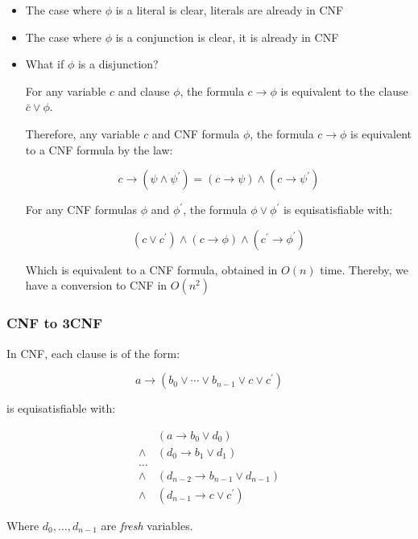 \documentclass{article}
\begin{document}
\begin{itemize}
  \item The case where $\phi$ is a literal is clear, literals are already in CNF
  \item The case where \(\phi\) is a conjunction is clear, it is already in CNF
  \item What if \(\phi\) is a disjunction?

        For any variable $c$ and clause \(\phi\), the formula $c \rightarrow \phi$ is equivalent to the clause $\bar{c} \vee \phi$.

        Therefore, any variable $c$ and CNF formula $\phi$, the formula $c \rightarrow \phi$ is equivalent to a CNF formula by the law:

        \[
        c \rightarrow (\psi\wedge\psi^{\prime}) = (c \rightarrow \psi) \wedge (c \rightarrow \psi^{\prime})
        \]

        For any CNF formulas \(\phi\) and \(\phi^{\prime}\), the formula \(\phi\vee\phi^{\prime}\) is equisatisfiable with:

        \[
        (c\vee c^{\prime}) \wedge (c \rightarrow \phi) \wedge (c^{\prime} \rightarrow \phi^{\prime})
        \]

        Which is equivalent to a CNF formula, obtained in $O(n)$ time. Thereby, we have a conversion to CNF in $O(n^{2})$


\end{itemize}

\subsubsection{CNF to 3CNF}
\label{subsec:CNF-3CNF}

In CNF, each clause is of the form:

\[
  a \rightarrow (b_{0} \vee \cdots \vee b_{n-1} \vee c \vee c^{\prime})
\]

is equisatisfiable with:

\begin{align*}
  &(a \rightarrow b_{0} \vee d_{0}) \\
  \wedge&(d_{0} \rightarrow b_{1} \vee d_{1}) \\
  \ldots &\\
  \wedge&(d_{n-2} \rightarrow b_{n-1} \vee d_{n-1}) \\
  \wedge&(d_{n-1} \rightarrow c \vee c^{\prime})
\end{align*}

Where $d_{0},\ldots, d_{n-1}$ are \textit{fresh} variables.
\end{document}
